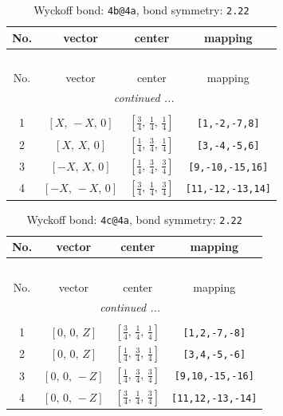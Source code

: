\documentclass[fleqn,8pt]{jsarticle}
\begin{document}
\begin{longtable}{cccc}
\caption{Wyckoff bond: {\tt 4b@4a}, bond symmetry: {\tt 2.22}}
 \\
 \hline \hline
No. & vector & center & mapping \\ \hline \endfirsthead

\multicolumn{3}{l}{\tablename\ \thetable{}} \\
 \hline \hline
No. & vector & center & mapping \\ \hline \endhead

 \hline \hline
\multicolumn{3}{r}{\footnotesize\it continued ...} \\ \endfoot

 \hline \hline
\multicolumn{3}{r}{} \\ \endlastfoot

1 & $\left[ X,\, - X,\, 0 \right]$ & $\left[ \frac{3}{4},\, \frac{1}{4},\, \frac{1}{4} \right]$ & {\tt [1,-2,-7,8]} \\ \hline
2 & $\left[ X,\, X,\, 0 \right]$ & $\left[ \frac{1}{4},\, \frac{3}{4},\, \frac{1}{4} \right]$ & {\tt [3,-4,-5,6]} \\ \hline
3 & $\left[ - X,\, X,\, 0 \right]$ & $\left[ \frac{1}{4},\, \frac{3}{4},\, \frac{3}{4} \right]$ & {\tt [9,-10,-15,16]} \\ \hline
4 & $\left[ - X,\, - X,\, 0 \right]$ & $\left[ \frac{3}{4},\, \frac{1}{4},\, \frac{3}{4} \right]$ & {\tt [11,-12,-13,14]} \\
\end{longtable}
\renewcommand{\arraystretch}{1.2}
\begin{longtable}{cccc}
\caption{Wyckoff bond: {\tt 4c@4a}, bond symmetry: {\tt 2.22}}
 \\
 \hline \hline
No. & vector & center & mapping \\ \hline \endfirsthead

\multicolumn{3}{l}{\tablename\ \thetable{}} \\
 \hline \hline
No. & vector & center & mapping \\ \hline \endhead

 \hline \hline
\multicolumn{3}{r}{\footnotesize\it continued ...} \\ \endfoot

 \hline \hline
\multicolumn{3}{r}{} \\ \endlastfoot

1 & $\left[ 0,\, 0,\, Z \right]$ & $\left[ \frac{3}{4},\, \frac{1}{4},\, \frac{1}{4} \right]$ & {\tt [1,2,-7,-8]} \\ \hline
2 & $\left[ 0,\, 0,\, Z \right]$ & $\left[ \frac{1}{4},\, \frac{3}{4},\, \frac{1}{4} \right]$ & {\tt [3,4,-5,-6]} \\ \hline
3 & $\left[ 0,\, 0,\, - Z \right]$ & $\left[ \frac{1}{4},\, \frac{3}{4},\, \frac{3}{4} \right]$ & {\tt [9,10,-15,-16]} \\ \hline
4 & $\left[ 0,\, 0,\, - Z \right]$ & $\left[ \frac{3}{4},\, \frac{1}{4},\, \frac{3}{4} \right]$ & {\tt [11,12,-13,-14]} \\
\end{longtable}
\end{document}
